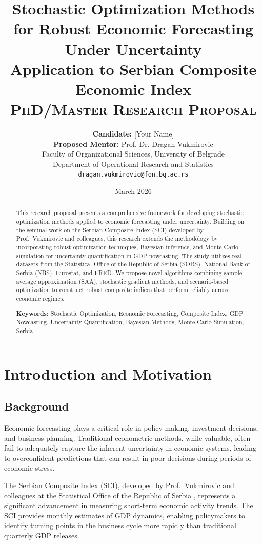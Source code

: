 \documentclass[12pt,a4paper]{article}
\title{
    \vspace{-1cm}
    \textbf{\Large Stochastic Optimization Methods for Robust Economic Forecasting Under Uncertainty} \\[0.5cm]
    \large Application to Serbian Composite Economic Index \\[1cm]
    \textsc{PhD/Master Research Proposal}
}
\author{
    \textbf{Candidate:} [Your Name] \\[0.3cm]
    \textbf{Proposed Mentor:} Prof. Dr. Dragan Vukmirovic \\
    Faculty of Organizational Sciences, University of Belgrade \\
    Department of Operational Research and Statistics \\[0.5cm]
    \texttt{dragan.vukmirovic@fon.bg.ac.rs}
}
\date{March 2026}
\begin{document}
\maketitle
\thispagestyle{empty}

\begin{abstract}
This research proposal presents a comprehensive framework for developing stochastic optimization methods applied to economic forecasting under uncertainty. Building on the seminal work on the Serbian Composite Index (SCI) developed by Prof.\ Vukmirovic and colleagues, this research extends the methodology by incorporating robust optimization techniques, Bayesian inference, and Monte Carlo simulation for uncertainty quantification in GDP nowcasting. The study utilizes real datasets from the Statistical Office of the Republic of Serbia (SORS), National Bank of Serbia (NBS), Eurostat, and FRED. We propose novel algorithms combining sample average approximation (SAA), stochastic gradient methods, and scenario-based optimization to construct robust composite indices that perform reliably across economic regimes.

\vspace{0.3cm}
\noindent\textbf{Keywords:} Stochastic Optimization, Economic Forecasting, Composite Index, GDP Nowcasting, Uncertainty Quantification, Bayesian Methods, Monte Carlo Simulation, Serbia
\end{abstract}

\newpage
\tableofcontents
\newpage

\section{Introduction and Motivation}

\subsection{Background}

Economic forecasting plays a critical role in policy-making, investment decisions, and business planning. Traditional econometric methods, while valuable, often fail to adequately capture the inherent uncertainty in economic systems, leading to overconfident predictions that can result in poor decisions during periods of economic stress.

The Serbian Composite Index (SCI), developed by Prof.\ Vukmirovic and colleagues at the Statistical Office of the Republic of Serbia \citep{vukmirovic2009sci, vukmirovic2013ntts}, represents a significant advancement in measuring short-term economic activity trends. The SCI provides monthly estimates of GDP dynamics, enabling policymakers to identify turning points in the business cycle more rapidly than traditional quarterly GDP releases.
\end{document}
